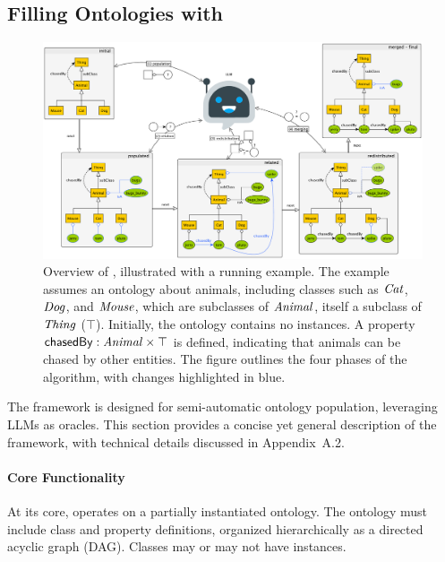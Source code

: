 \subsection{Filling Ontologies with \llmfkg}
\label{subsec:filling-ontologies-kgfiller}

\begin{figure}
    \centering
    \includegraphics[width=\linewidth]{figures/kgfiller/roadmap}
    \caption[Overview of \llmfkg{}]{%
        Overview of \llmfkg{}, illustrated with a running example.
        The example assumes an ontology about animals, including classes such as $\concept{Cat}$, $\concept{Dog}$, and $\concept{Mouse}$, which are subclasses of $\concept{Animal}$, itself a subclass of $\concept{Thing}$ (\(\top\)).
        Initially, the ontology contains no instances.
        A property $\relation{chasedBy} : \concept{Animal} \times \top$ is defined, indicating that animals can be chased by other entities.
        The figure outlines the four phases of the \llmfkg{} algorithm, with changes highlighted in blue.
    }
    \label{fig:roadmap}
\end{figure}

The \llmfkg{} framework is designed for semi-automatic ontology population, leveraging \glspl{LLM} as oracles.
%
This section provides a concise yet general description of the framework, with technical details discussed in Appendix~A.2.

%
\paragraph{Core Functionality}
\label{par:core-functionality}

At its core, \llmfkg{} operates on a partially instantiated ontology.
%
The ontology must include class and property definitions, organized hierarchically as a directed acyclic graph (DAG).
%
Classes may or may not have instances.

